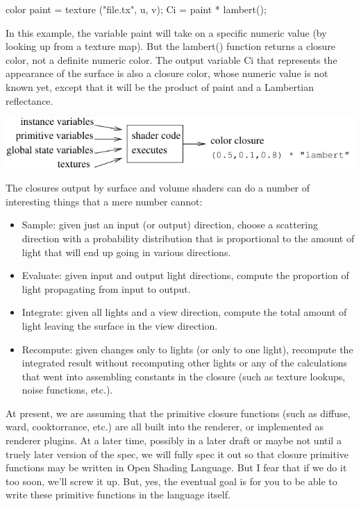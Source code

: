 \documentclass[11pt,letterpaper]{book}
\def\langname{Open Shading Language\xspace}
\def\color{{\cf color}\xspace}
\def\colorclosure{{\cf closure color}\xspace}
\begin{document}
\begin{code}
    color paint = texture ("file.tx", u, v);
    Ci = paint * lambert();
\end{code}

\noindent In this example, the variable {\cf paint} will take on a
specific numeric value (by looking up from a texture map).  But the {\cf
  lambert()} function returns a \colorclosure, not a definite numeric
\color.  The output variable {\cf Ci} that represents the appearance of
the surface is also a \colorclosure, whose numeric value is not known
yet, except that it will be the product of {\cf paint} and a Lambertian
reflectance.

\bigskip

\includegraphics{Figures/shaderexecschematic}

\medskip

The closures output by surface and volume shaders can do a number of
interesting things that a mere number cannot:

\begin{itemize}
\item Sample: given just an input (or output) direction, choose a
  scattering direction with a probability distribution that is
  proportional to the amount of light that will end up going in various
  directions.
\item Evaluate: given input and output light directions, compute the
  proportion of light propagating from input to output.
\item Integrate: given all lights and a view direction, compute
  the total amount of light leaving the surface in the view direction.
\item Recompute: given changes only to lights (or only to one light),
  recompute the integrated result without recomputing other lights or
  any of the calculations that went into assembling constants in the
  closure (such as texture lookups, noise functions, etc.).
\end{itemize}

\begin{annotate}
At present, we are assuming that the primitive closure functions (such
as {\cf diffuse}, {\cf ward}, {\cf cooktorrance}, etc.) are all built
into the renderer, or implemented as renderer plugins.  At a later time,
possibly in a later draft or maybe not until a truely later version of
the spec, we will fully spec it out so that closure primitive functions
may be written in \langname.  But I fear that if we do it too soon,
we'll screw it up.  But, yes, the eventual goal is for you to be able to
write these primitive functions in the language itself.
\end{annotate}
\end{document}
